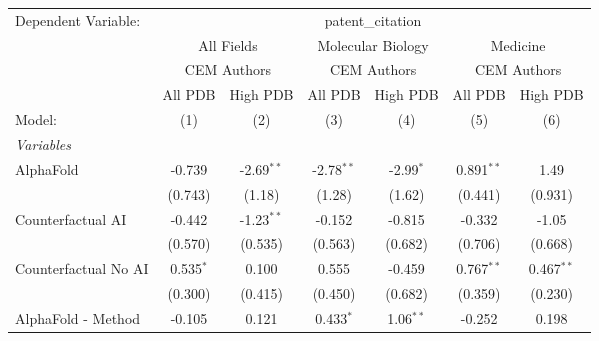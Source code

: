 \begingroup
\centering
\begin{tabular}{lcccccc}
   \tabularnewline \midrule \midrule
   Dependent Variable: & \multicolumn{6}{c}{patent\_citation}\\
 & \multicolumn{2}{c}{All Fields} & \multicolumn{2}{c}{Molecular Biology} & \multicolumn{2}{c}{Medicine} \\
\cmidrule(lr){2-3} \cmidrule(lr){4-5} \cmidrule(lr){6-7}
 & \multicolumn{2}{c}{CEM Authors} & \multicolumn{2}{c}{CEM Authors} & \multicolumn{2}{c}{CEM Authors} \\
\cmidrule(lr){2-3} \cmidrule(lr){4-5} \cmidrule(lr){6-7}
 & \multicolumn{1}{c}{All PDB} & \multicolumn{1}{c}{High PDB} & \multicolumn{1}{c}{All PDB} & \multicolumn{1}{c}{High PDB} & \multicolumn{1}{c}{All PDB} & \multicolumn{1}{c}{High PDB} \\
\cmidrule(lr){2-2} \cmidrule(lr){3-3} \cmidrule(lr){4-4} \cmidrule(lr){5-5} \cmidrule(lr){6-6} \cmidrule(lr){7-7}
   Model:                                                     & (1)           & (2)           & (3)            & (4)           & (5)           & (6)\\  
   \midrule
   \emph{Variables}\\
   AlphaFold                                                  & -0.739        & -2.69$^{**}$  & -2.78$^{**}$   & -2.99$^{*}$   & 0.891$^{**}$  & 1.49\\   
                                                              & (0.743)       & (1.18)        & (1.28)         & (1.62)        & (0.441)       & (0.931)\\   
   Counterfactual AI                                          & -0.442        & -1.23$^{**}$  & -0.152         & -0.815        & -0.332        & -1.05\\   
                                                              & (0.570)       & (0.535)       & (0.563)        & (0.682)       & (0.706)       & (0.668)\\   
   Counterfactual No AI                                       & 0.535$^{*}$   & 0.100         & 0.555          & -0.459        & 0.767$^{**}$  & 0.467$^{**}$\\   
                                                              & (0.300)       & (0.415)       & (0.450)        & (0.682)       & (0.359)       & (0.230)\\   
   AlphaFold - Method                                         & -0.105        & 0.121         & 0.433$^{*}$    & 1.06$^{**}$   & -0.252        & 0.198\\   

\end{tabular}
